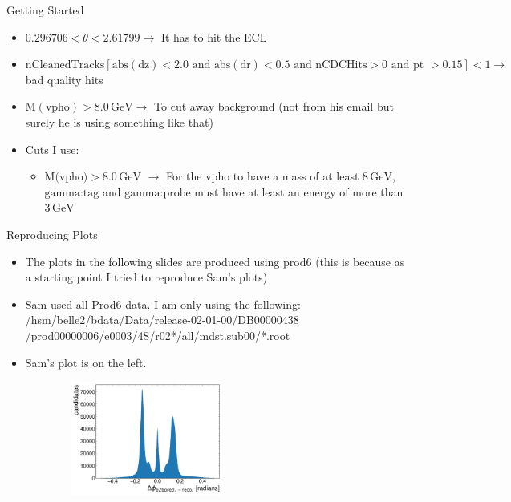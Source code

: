 \documentclass[10pt]{beamer}
\begin{document}
{\begin{frame}{Getting Started}
\begin{itemize}
	
		\begin{itemize}
			\item $0.296706 < \theta < 2.61799 \rightarrow$ It has to hit the ECL
			\item $\textrm{nCleanedTracks}[ \textrm{abs}(\textrm{dz}) < 2.0 \textrm{ and } \textrm{abs}(\textrm{dr}) < 0.5 \textrm{ and nCDCHits} > 0 \textrm{ and pt } > 0.15] < 1 \rightarrow $ bad quality hits 
			\item $\textrm{M}(\textrm{vpho}) > 8.0\,\textrm{GeV} \rightarrow $ To cut away background (not from his email but surely he is using something like that)					
		\end{itemize}
	
\end{itemize}

\begin{itemize}
	\item Cuts I use:
	\begin{itemize}
		\item $\textrm{M(vpho)}>8.0\, \textrm{GeV}$ $\rightarrow$ For the vpho to have a mass of at least $8\,\textrm{GeV}$, $\textrm{gamma:tag}$ and $\textrm{gamma:probe}$ must have at least an energy of more than $3\,\textrm{GeV}$
	
	\end{itemize}
\end{itemize}

	
\end{frame}

\begin{frame}{Reproducing Plots}
	
	\begin{itemize}
		\item The plots in the following slides are produced using prod6 (this is because as a starting point I tried to reproduce Sam's plots)
		\item Sam used all Prod6 data. I am only using the following: /hsm/belle2/bdata/Data/release-02-01-00/DB00000438 /prod00000006/e0003/4S/r02*/all/mdst.sub00/*.root
		
		\item Sam's plot is on the left.	
		
\end{itemize}
	
	
	\begin{figure}
		\begin{subfigure}{.5\textwidth}
		\centering
		\includegraphics[width=5cm]{Plots/deltaPhiSam.jpeg}
		

\end{subfigure}
\end{figure}
\end{frame}}
\end{document}
